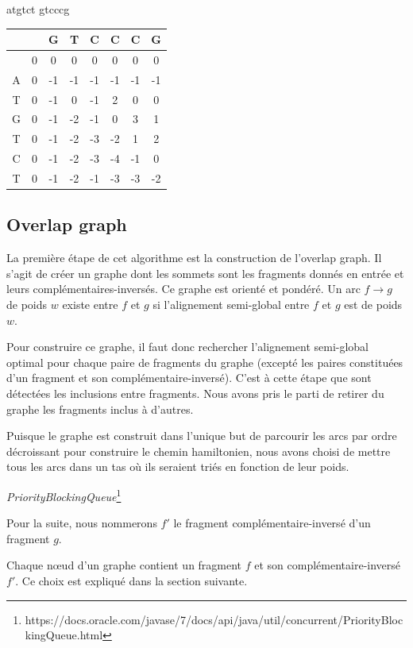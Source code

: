 \documentclass{article}
\begin{document}
atgtct
gtcccg

\begin{table}[h]
	\centering
	\begin{tabular}{|c|c|c|c|c|c|c|c|}
		\hline
		 & & G & T & C & C & C & G
		\\\hline
		&0&0&0&0&0&0&0
		\\\hline
        		A&0&-1&-1&-1&-1&-1&-1
		\\\hline
		T&0&-1&0&-1&2&0&0
		\\\hline
		G&0&-1&-2&-1&0&3&1
		\\\hline
		T&0&-1&-2&-3&-2&1&\cellcolor[gray]{0.8}2
		\\\hline
		C&0&-1&-2&-3&-4&-1&0
		\\\hline
		T&0&-1&-2&-1&-3&-3&-2
		\\\hline
	\end{tabular}
\end{table}

\subsection{Overlap graph}

La première étape de cet algorithme est la construction de l'overlap graph. Il s'agit de créer un graphe dont les sommets sont les fragments donnés en entrée et leurs complémentaires-inversés. Ce graphe est orienté et pondéré. Un arc $f\to g$ de poids $w$ existe entre $f$ et $g$ si l'alignement semi-global entre $f$ et $g$ est de poids $w$.

Pour construire ce graphe, il faut donc rechercher l'alignement semi-global optimal pour chaque paire de fragments du graphe (excepté les paires constituées d'un fragment et son complémentaire-inversé). C'est à cette étape que sont détectées les inclusions entre fragments. Nous avons pris le parti de retirer du graphe les fragments inclus à d'autres.

Puisque le graphe est construit dans l'unique but de parcourir les arcs par ordre décroissant pour construire le chemin hamiltonien, nous avons choisi de mettre tous les arcs dans un tas où ils seraient triés en fonction de leur poids.

\textit{PriorityBlockingQueue}\footnote{https://docs.oracle.com/javase/7/docs/api/java/util/concurrent/PriorityBlockingQueue.html}

Pour la suite, nous nommerons $f'$ le fragment complémentaire-inversé d'un fragment $g$. 

Chaque nœud d'un graphe contient un fragment $f$ et son complémentaire-inversé $f'$. Ce choix est expliqué dans la section suivante.
\end{document}
